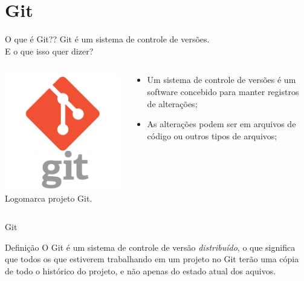 \documentclass{beamer}
\begin{document}
\section{Git}
\begin{frame}{O que é Git??}
   Git é um sistema de controle de versões.\\
   E o que isso quer dizer?
  \begin{columns}
    \begin{column}{0.4\textwidth}
       \includegraphics[height=0.4\paperheight]{fig/aula3/git_logo.png} \\
       \tiny{Logomarca projeto Git}.
    \end{column}
    \begin{column}{0.4\textwidth}
      \begin{itemize}
        \item Um sistema de controle de versões é um software concebido 
para manter registros de alterações;
	 \item As alterações podem ser em arquivos de código ou outros 
tipos de arquivos;
      \end{itemize} 
    \end{column}    
  \end{columns}
\end{frame}
\begin{frame}{Git}
  \begin{block}{Definição}
    O Git é um sistema de controle de versão \textit{distribuído}, o que 
significa que todos os que estiverem trabalhando em um projeto no Git terão uma 
cópia de todo o histórico do projeto, e não apenas do estado atual dos aquivos.
  \end{block}
  \tiny{\cite{beer2015github}}

\end{frame}
\end{document}
